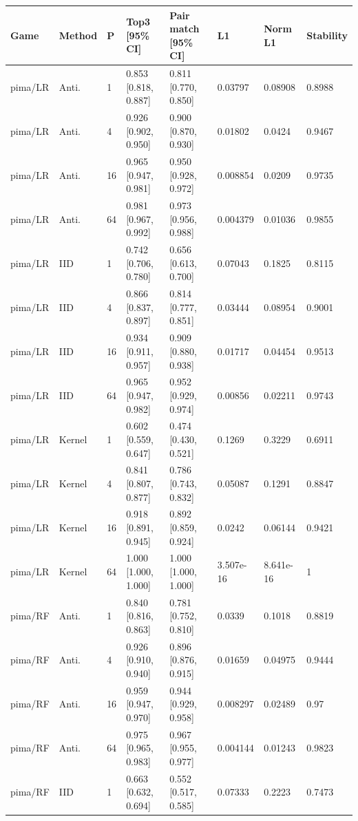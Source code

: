 \begingroup\footnotesize\setlength{\tabcolsep}{3pt}
\begin{tabular}{llllllll}
\toprule
Game & Method & P & Top3 [95\% CI] & Pair match [95\% CI] & L1 & Norm L1 & Stability \\
\midrule
pima/LR & Anti. & 1 & 0.853 [0.818, 0.887] & 0.811 [0.770, 0.850] & 0.03797 & 0.08908 & 0.8988 \\
pima/LR & Anti. & 4 & 0.926 [0.902, 0.950] & 0.900 [0.870, 0.930] & 0.01802 & 0.0424 & 0.9467 \\
pima/LR & Anti. & 16 & 0.965 [0.947, 0.981] & 0.950 [0.928, 0.972] & 0.008854 & 0.0209 & 0.9735 \\
pima/LR & Anti. & 64 & 0.981 [0.967, 0.992] & 0.973 [0.956, 0.988] & 0.004379 & 0.01036 & 0.9855 \\
pima/LR & IID & 1 & 0.742 [0.706, 0.780] & 0.656 [0.613, 0.700] & 0.07043 & 0.1825 & 0.8115 \\
pima/LR & IID & 4 & 0.866 [0.837, 0.897] & 0.814 [0.777, 0.851] & 0.03444 & 0.08954 & 0.9001 \\
pima/LR & IID & 16 & 0.934 [0.911, 0.957] & 0.909 [0.880, 0.938] & 0.01717 & 0.04454 & 0.9513 \\
pima/LR & IID & 64 & 0.965 [0.947, 0.982] & 0.952 [0.929, 0.974] & 0.00856 & 0.02211 & 0.9743 \\
pima/LR & Kernel & 1 & 0.602 [0.559, 0.647] & 0.474 [0.430, 0.521] & 0.1269 & 0.3229 & 0.6911 \\
pima/LR & Kernel & 4 & 0.841 [0.807, 0.877] & 0.786 [0.743, 0.832] & 0.05087 & 0.1291 & 0.8847 \\
pima/LR & Kernel & 16 & 0.918 [0.891, 0.945] & 0.892 [0.859, 0.924] & 0.0242 & 0.06144 & 0.9421 \\
pima/LR & Kernel & 64 & 1.000 [1.000, 1.000] & 1.000 [1.000, 1.000] & 3.507e-16 & 8.641e-16 & 1 \\
pima/RF & Anti. & 1 & 0.840 [0.816, 0.863] & 0.781 [0.752, 0.810] & 0.0339 & 0.1018 & 0.8819 \\
pima/RF & Anti. & 4 & 0.926 [0.910, 0.940] & 0.896 [0.876, 0.915] & 0.01659 & 0.04975 & 0.9444 \\
pima/RF & Anti. & 16 & 0.959 [0.947, 0.970] & 0.944 [0.929, 0.958] & 0.008297 & 0.02489 & 0.97 \\
pima/RF & Anti. & 64 & 0.975 [0.965, 0.983] & 0.967 [0.955, 0.977] & 0.004144 & 0.01243 & 0.9823 \\
pima/RF & IID & 1 & 0.663 [0.632, 0.694] & 0.552 [0.517, 0.585] & 0.07333 & 0.2223 & 0.7473 \\

\end{tabular}
